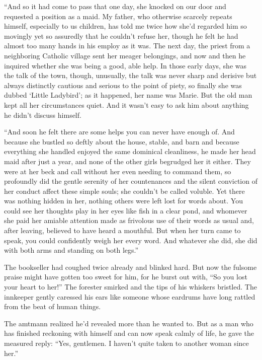 \documentclass[12pt,a4paper]{article}
\begin{document}
“And so it had come to pass that one day, she knocked on our door and requested a position as a maid. My father, who otherwise scarcely repeats himself, especially to us children, has told me twice how she’d regarded him so movingly yet so assuredly that he couldn’t refuse her, though he felt he had almost too many hands in his employ as it was. The next day, the priest from a neighboring Catholic village sent her meager belongings, and now and then he inquired whether she was being a good, able help. In those early days, she was the talk of the town, though, unusually, the talk was never sharp and derisive but always distinctly cautious and serious to the point of piety, so finally she was dubbed ‘Little Ladybird’; as it happened, her name was Marie. But the old man kept all her circumstances quiet. And it wasn’t easy to ask him about anything he didn’t discuss himself.

“And soon he felt there are some helps you can never have enough of. And because she bustled so deftly about the house, stable, and barn and because everything she handled enjoyed the same dominical cleanliness, he made her head maid after just a year, and none of the other girls begrudged her it either. They were at her beck and call without her even needing to command them, so profoundly did the gentle serenity of her countenances and the silent conviction of her conduct affect these simple souls; she couldn’t be called voluble. Yet there was nothing hidden in her, nothing others were left lost for words about. You could see her thoughts play in her eyes like fish in a clear pond, and whomever she paid her amiable attention made as frivolous use of their words as usual and, after leaving, believed to have heard a mouthful. But when her turn came to speak, you could confidently weigh her every word. And whatever she did, she did with both arms and standing on both legs.”

The bookseller had coughed twice already and blinked hard. But now the fulsome praise might have gotten too sweet for him, for he burst out with, “So you lost your heart to her!” The forester smirked and the tips of his whiskers bristled. The innkeeper gently caressed his ears like someone whose eardrums have long rattled from the beat of human things.

The amtmann realized he’d revealed more than he wanted to. But as a man who has finished reckoning with himself and can now speak calmly of life, he gave the measured reply: “Yes, gentlemen. I haven’t quite taken to another woman since her.”
\end{document}
